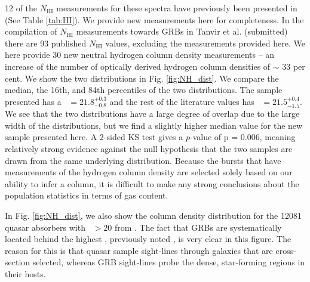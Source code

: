 \documentclass[longauth]{aa}    %
\begin{document}
12 of the $N_{\mathrm{HI}}$ measurements for these spectra have previously been
presented in \citet{Cucchiara2015} (See Table \ref{tab:HI}). We provide new
measurements here for completeness. In the compilation of $N_{\mathrm{HI}}$
measurements towards GRBs in Tanvir et al. (submitted) there are 93 published
$N_{\mathrm{HI}}$ values, excluding the measurements provided here. We here
provide 30 new neutral hydrogen column density measurements -- an increase of
the number of optically derived hydrogen column densities of $\sim$ 33 per cent.
We show the two distributions in  Fig. \ref{fig:NH_dist}. We compare the median,
the 16th, and 84th percentiles of the two distributions. The sample presented
has a \nh~$= 21.8_{-0.8}^{+0.3}$ and the rest of the literature values has
\nh~$= 21.5_{-1.5}^{+0.4}$. We see that the two distributions have a large
degree of overlap due to the large width of the distributions, but we find a
slightly higher median value for the new sample presented here. A 2-sided KS
test gives a $p$-value of p = 0.006, meaning relatively strong evidence against the
null hypothesis that the two samples are drawn from the same underlying distribution.
Because the bursts that have measurements of the hydrogen column density are
selected solely based on our ability to infer a column, it is difficult to make
any strong conclusions about the population statistics in terms of gas content.

In Fig. \ref{fig:NH_dist}, we also show the column density distribution
for the 12081 quasar absorbers with \nh~$> 20$ from \citet{Noterdaeme2012b}. The
fact that GRBs are systematically located behind the highest \nh, previously
noted \citep[e.g.,][]{Prochaska2007, Fynbo2009}, is very clear in this
figure. The reason for this is that quasar sample sight-lines through galaxies
that are cross-section selected, whereas GRB sight-lines probe the dense,
star-forming regions in their hosts.
\end{document}
